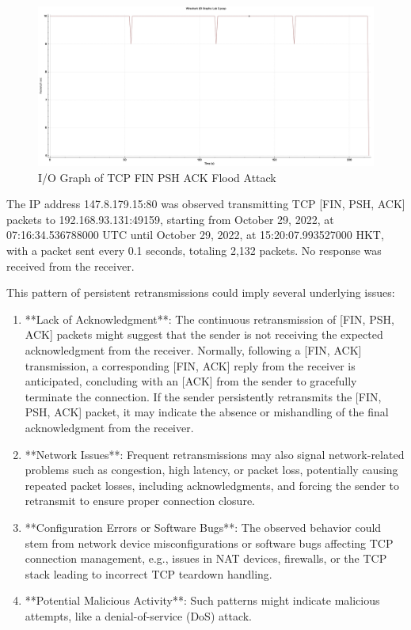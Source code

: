 \documentclass{article}
\begin{document}
    \begin{figure}[H]
        \centering
        \includegraphics[width=\textwidth]{image/15_131_fin_tcp.png}
        \caption{I/O Graph of TCP FIN PSH ACK Flood Attack}
        \label{fig:tcp-fin-psh-ack-flood-io-graph}
    \end{figure}

    The IP address 147.8.179.15:80 was observed transmitting TCP [FIN, PSH, ACK] packets to 192.168.93.131:49159, starting from October 29, 2022, at 07:16:34.536788000 UTC until October 29, 2022, at 15:20:07.993527000 HKT, with a packet sent every 0.1 seconds, totaling 2,132 packets. 
    No response was received from the receiver.

    This pattern of persistent retransmissions could imply several underlying issues:

    \begin{enumerate}
        \item **Lack of Acknowledgment**: The continuous retransmission of [FIN, PSH, ACK] packets might suggest that the sender is not receiving the expected acknowledgment from the receiver. 
        Normally, following a [FIN, ACK] transmission, a corresponding [FIN, ACK] reply from the receiver is anticipated, concluding with an [ACK] from the sender to gracefully terminate the connection. 
        If the sender persistently retransmits the [FIN, PSH, ACK] packet, it may indicate the absence or mishandling of the final acknowledgment from the receiver.
        \item **Network Issues**: Frequent retransmissions may also signal network-related problems such as congestion, high latency, or packet loss, potentially causing repeated packet losses, including acknowledgments, and forcing the sender to retransmit to ensure proper connection closure.
        \item **Configuration Errors or Software Bugs**: The observed behavior could stem from network device misconfigurations or software bugs affecting TCP connection management, e.g., issues in NAT devices, firewalls, or the TCP stack leading to incorrect TCP teardown handling.
        \item **Potential Malicious Activity**: Such patterns might indicate malicious attempts, like a denial-of-service (DoS) attack. 
    \end{enumerate}
\end{document}
